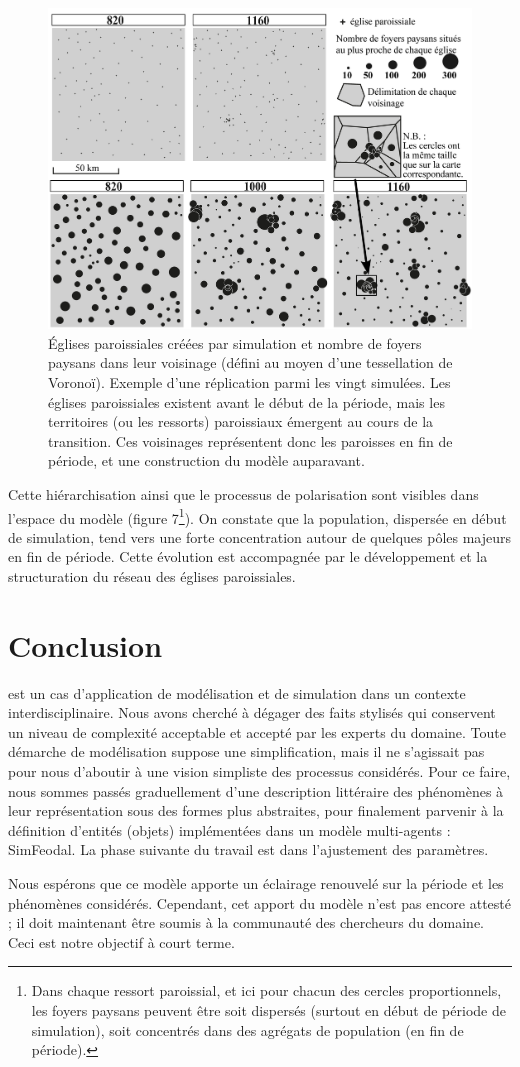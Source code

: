 \documentclass[12pt, a4paper, oneside]{book}
\begin{document}
	\begin{figure}[!h]
		\centering
		\includegraphics[width=1\linewidth]{src/Chapitre_TMD/Fig7}
		\caption{Églises paroissiales créées par simulation et nombre de foyers paysans dans leur voisinage (défini au moyen d’une tessellation de Voronoï).
		Exemple d’une réplication parmi les vingt simulées.
		Les églises paroissiales existent avant le début de la période, mais les territoires (ou les ressorts) paroissiaux émergent au cours de la transition.
		Ces voisinages représentent donc les paroisses en fin de période, et une construction du modèle auparavant.}
		\label{fig:fig7}
	\end{figure}

	Cette hiérarchisation ainsi que le processus de polarisation sont visibles dans l'espace du modèle (figure 7\footnote{
	Dans chaque ressort paroissial, et ici pour chacun des cercles proportionnels, les foyers paysans peuvent être soit dispersés (surtout en début de période de simulation), soit concentrés dans des agrégats de population (en fin de période).
}).
	On constate que la population, dispersée en début de simulation, tend vers une forte concentration autour de quelques pôles majeurs en fin de période.
	Cette évolution est accompagnée par le développement et la structuration du réseau des églises paroissiales.
	
	\section*{Conclusion}
	
	 est un cas d'application de modélisation et de simulation dans un contexte interdisciplinaire.
	Nous avons cherché à dégager des faits stylisés qui conservent un niveau de complexité acceptable et accepté par les experts du domaine.
	Toute démarche de modélisation suppose une simplification, mais il ne s'agissait pas pour nous d'aboutir à une vision simpliste des processus considérés.
	Pour ce faire, nous sommes passés graduellement d'une description littéraire des phénomènes à leur représentation sous des formes plus abstraites, pour finalement parvenir à la définition d'entités (objets) implémentées dans un modèle multi-agents : SimFeodal.
	La phase suivante du travail est dans l'ajustement des paramètres.
	
	Nous espérons que ce modèle apporte un éclairage renouvelé sur la période et les phénomènes considérés.
	Cependant, cet apport du modèle n'est pas encore attesté ; il doit maintenant être soumis à la communauté des chercheurs du domaine.
	Ceci est notre objectif à court terme.
	
\end{document}
